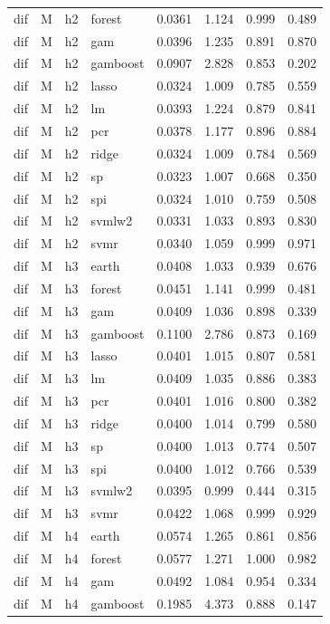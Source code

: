 \begin{ThreePartTable}
\begin{longtable}[t]{llclcccc}
dif & M & h2 & forest & 0.0361 & 1.124 & 0.999 & 0.489\\
dif & M & h2 & gam & 0.0396 & 1.235 & 0.891 & 0.870\\
dif & M & h2 & gamboost & 0.0907 & 2.828 & 0.853 & 0.202\\
dif & M & h2 & lasso & 0.0324 & 1.009 & 0.785 & 0.559\\
dif & M & h2 & lm & 0.0393 & 1.224 & 0.879 & 0.841\\
dif & M & h2 & pcr & 0.0378 & 1.177 & 0.896 & 0.884\\
dif & M & h2 & ridge & 0.0324 & 1.009 & 0.784 & 0.569\\
dif & M & h2 & sp & 0.0323 & 1.007 & 0.668 & 0.350\\
dif & M & h2 & spi & 0.0324 & 1.010 & 0.759 & 0.508\\
dif & M & h2 & svmlw2 & 0.0331 & 1.033 & 0.893 & 0.830\\
dif & M & h2 & svmr & 0.0340 & 1.059 & 0.999 & 0.971\\
\addlinespace
dif & M & h3 & earth & 0.0408 & 1.033 & 0.939 & 0.676\\
dif & M & h3 & forest & 0.0451 & 1.141 & 0.999 & 0.481\\
dif & M & h3 & gam & 0.0409 & 1.036 & 0.898 & 0.339\\
dif & M & h3 & gamboost & 0.1100 & 2.786 & 0.873 & 0.169\\
dif & M & h3 & lasso & 0.0401 & 1.015 & 0.807 & 0.581\\
dif & M & h3 & lm & 0.0409 & 1.035 & 0.886 & 0.383\\
dif & M & h3 & pcr & 0.0401 & 1.016 & 0.800 & 0.382\\
dif & M & h3 & ridge & 0.0400 & 1.014 & 0.799 & 0.580\\
dif & M & h3 & sp & 0.0400 & 1.013 & 0.774 & 0.507\\
dif & M & h3 & spi & 0.0400 & 1.012 & 0.766 & 0.539\\
dif & M & h3 & svmlw2 & 0.0395 & 0.999 & 0.444 & 0.315\\
dif & M & h3 & svmr & 0.0422 & 1.068 & 0.999 & 0.929\\
\addlinespace
dif & M & h4 & earth & 0.0574 & 1.265 & 0.861 & 0.856\\
dif & M & h4 & forest & 0.0577 & 1.271 & 1.000 & 0.982\\
dif & M & h4 & gam & 0.0492 & 1.084 & 0.954 & 0.334\\
dif & M & h4 & gamboost & 0.1985 & 4.373 & 0.888 & 0.147\\

\end{longtable}
\end{ThreePartTable}
